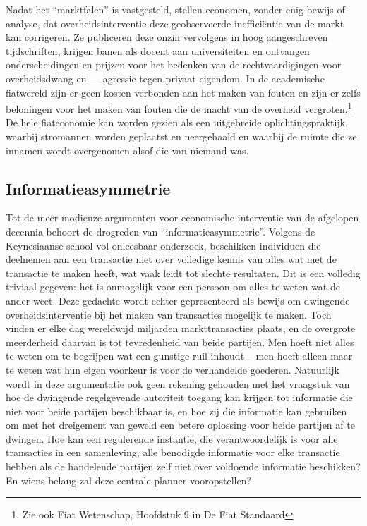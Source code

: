 Nadat het ``marktfalen'' is vastgesteld, stellen economen, zonder enig bewijs of analyse, dat overheidsinterventie deze geobserveerde inefficiëntie van de markt kan corrigeren. Ze publiceren deze onzin vervolgens in hoog aangeschreven tijdschriften, krijgen banen als docent aan universiteiten en ontvangen onderscheidingen en prijzen voor het bedenken van de rechtvaardigingen voor overheidsdwang en --- agressie tegen privaat eigendom. In de academische fiatwereld zijn er geen kosten verbonden aan het maken van fouten en zijn er zelfs beloningen voor het maken van fouten die de macht van de overheid vergroten.\footnote{Zie ook Fiat Wetenschap, Hoofdstuk 9 in De Fiat Standaard} De hele fiateconomie kan worden gezien als een uitgebreide oplichtingspraktijk, waarbij stromannen worden geplaatst en neergehaald en waarbij de ruimte die ze innamen wordt overgenomen alsof die van niemand was.

\subsection{Informatieasymmetrie}

Tot de meer modieuze argumenten voor economische interventie van de afgelopen decennia behoort de drogreden van ``informatieasymmetrie''. Volgens de Keynesiaanse school vol onleesbaar onderzoek, beschikken individuen die deelnemen aan een transactie niet over volledige kennis van alles wat met de transactie te maken heeft, wat vaak leidt tot slechte resultaten. Dit is een volledig triviaal gegeven: het is onmogelijk voor een persoon om alles te weten wat de ander weet. Deze gedachte wordt echter gepresenteerd als bewijs om dwingende overheidsinterventie bij het maken van transacties mogelijk te maken. Toch vinden er elke dag wereldwijd miljarden markttransacties plaats, en de overgrote meerderheid daarvan is tot tevredenheid van beide partijen. Men hoeft niet alles te weten om te begrijpen wat een gunstige ruil inhoudt -- men hoeft alleen maar te weten wat hun eigen voorkeur is voor de verhandelde goederen. Natuurlijk wordt in deze argumentatie ook geen rekening gehouden met het vraagstuk van hoe de dwingende regelgevende autoriteit toegang kan krijgen tot informatie die niet voor beide partijen beschikbaar is, en hoe zij die informatie kan gebruiken om met het dreigement van geweld een betere oplossing voor beide partijen af te dwingen. Hoe kan een regulerende instantie, die verantwoordelijk is voor alle transacties in een samenleving, alle benodigde informatie voor elke transactie hebben als de handelende partijen zelf niet over voldoende informatie beschikken? En wiens belang zal deze centrale planner vooropstellen?

